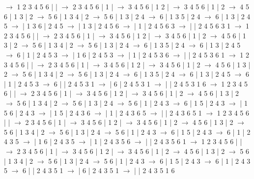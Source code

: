 \documentclass{article}
\begin{document}
\newline
 $\rightarrow$ 1 2 3 4 5 6 |  |  $\rightarrow$ 2 3 4 5 6 | 1 |  $\rightarrow$ 3 4 5 6 | 1 2 |  $\rightarrow$ 3 4 5 6 | 1 | 2 $\rightarrow$ 4 5 6 | 1 3 | 2 $\rightarrow$ 5 6 | 1 3 4 | 2 $\rightarrow$ 5 6 | 1 3 | 2 4 $\rightarrow$ 6 | 1 3 5 | 2 4 $\rightarrow$ 6 | 1 3 | 2 4 5 $\rightarrow$  | 1 3 6 | 2 4 5 $\rightarrow$  | 1 3 | 2 4 5 6 $\rightarrow$  | 1 | 2 4 5 6 3 $\rightarrow$  |  | 2 4 5 6 3 1
\newline
 $\rightarrow$ 1 2 3 4 5 6 |  |  $\rightarrow$ 2 3 4 5 6 | 1 |  $\rightarrow$ 3 4 5 6 | 1 2 |  $\rightarrow$ 3 4 5 6 | 1 | 2 $\rightarrow$ 4 5 6 | 1 3 | 2 $\rightarrow$ 5 6 | 1 3 4 | 2 $\rightarrow$ 5 6 | 1 3 | 2 4 $\rightarrow$ 6 | 1 3 5 | 2 4 $\rightarrow$ 6 | 1 3 | 2 4 5 $\rightarrow$ 6 | 1 | 2 4 5 3 $\rightarrow$  | 1 6 | 2 4 5 3 $\rightarrow$  | 1 | 2 4 5 3 6 $\rightarrow$  |  | 2 4 5 3 6 1
\newline
 $\rightarrow$ 1 2 3 4 5 6 |  |  $\rightarrow$ 2 3 4 5 6 | 1 |  $\rightarrow$ 3 4 5 6 | 1 2 |  $\rightarrow$ 3 4 5 6 | 1 | 2 $\rightarrow$ 4 5 6 | 1 3 | 2 $\rightarrow$ 5 6 | 1 3 4 | 2 $\rightarrow$ 5 6 | 1 3 | 2 4 $\rightarrow$ 6 | 1 3 5 | 2 4 $\rightarrow$ 6 | 1 3 | 2 4 5 $\rightarrow$ 6 | 1 | 2 4 5 3 $\rightarrow$ 6 |  | 2 4 5 3 1 $\rightarrow$  | 6 | 2 4 5 3 1 $\rightarrow$  |  | 2 4 5 3 1 6
\newline
 $\rightarrow$ 1 2 3 4 5 6 |  |  $\rightarrow$ 2 3 4 5 6 | 1 |  $\rightarrow$ 3 4 5 6 | 1 2 |  $\rightarrow$ 3 4 5 6 | 1 | 2 $\rightarrow$ 4 5 6 | 1 3 | 2 $\rightarrow$ 5 6 | 1 3 4 | 2 $\rightarrow$ 5 6 | 1 3 | 2 4 $\rightarrow$ 5 6 | 1 | 2 4 3 $\rightarrow$ 6 | 1 5 | 2 4 3 $\rightarrow$  | 1 5 6 | 2 4 3 $\rightarrow$  | 1 5 | 2 4 3 6 $\rightarrow$  | 1 | 2 4 3 6 5 $\rightarrow$  |  | 2 4 3 6 5 1
\newline
 $\rightarrow$ 1 2 3 4 5 6 |  |  $\rightarrow$ 2 3 4 5 6 | 1 |  $\rightarrow$ 3 4 5 6 | 1 2 |  $\rightarrow$ 3 4 5 6 | 1 | 2 $\rightarrow$ 4 5 6 | 1 3 | 2 $\rightarrow$ 5 6 | 1 3 4 | 2 $\rightarrow$ 5 6 | 1 3 | 2 4 $\rightarrow$ 5 6 | 1 | 2 4 3 $\rightarrow$ 6 | 1 5 | 2 4 3 $\rightarrow$ 6 | 1 | 2 4 3 5 $\rightarrow$  | 1 6 | 2 4 3 5 $\rightarrow$  | 1 | 2 4 3 5 6 $\rightarrow$  |  | 2 4 3 5 6 1
\newline
 $\rightarrow$ 1 2 3 4 5 6 |  |  $\rightarrow$ 2 3 4 5 6 | 1 |  $\rightarrow$ 3 4 5 6 | 1 2 |  $\rightarrow$ 3 4 5 6 | 1 | 2 $\rightarrow$ 4 5 6 | 1 3 | 2 $\rightarrow$ 5 6 | 1 3 4 | 2 $\rightarrow$ 5 6 | 1 3 | 2 4 $\rightarrow$ 5 6 | 1 | 2 4 3 $\rightarrow$ 6 | 1 5 | 2 4 3 $\rightarrow$ 6 | 1 | 2 4 3 5 $\rightarrow$ 6 |  | 2 4 3 5 1 $\rightarrow$  | 6 | 2 4 3 5 1 $\rightarrow$  |  | 2 4 3 5 1 6
\end{document}

